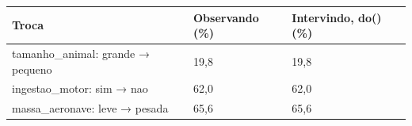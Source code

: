 \begin{tabular}{lll}
\toprule
Troca & Observando (\%) & Intervindo, do() (\%) \\
\midrule
tamanho\_animal: grande → pequeno & 19,8 & 19,8 \\
ingestao\_motor: sim → nao & 62,0 & 62,0 \\
massa\_aeronave: leve → pesada & 65,6 & 65,6 \\
\bottomrule
\end{tabular}
